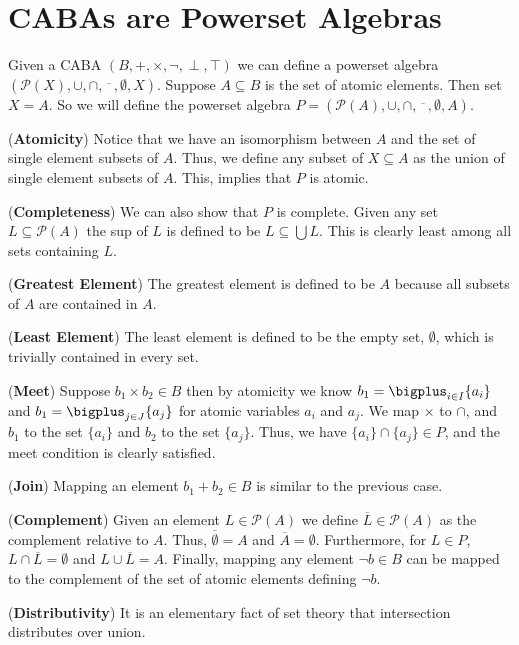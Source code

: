 \documentclass{article}
\newcommand{\powerset}[1]{\mathcal{P}(#1)}
\newcommand{\comp}[1]{\overline{#1}}
\begin{document}
\section{CABAs are Powerset Algebras}
\label{sec:cabas_are_powerset_algebras}

Given a CABA $(B,+,\times,\lnot,\perp,\top)$ we can define a powerset
algebra $(\powerset{X},\cup,\cap,
\overline{\stackrel{\,\,\,\,}{\stackrel{\,\,\,\,}{\,\,\,\,}}},\emptyset,X)$.
Suppose $A \subseteq B$ is the set of atomic elements.  Then set $X =
A$.  So we will define the powerset algebra $P = (\powerset{A},\cup,\cap,
\overline{\stackrel{\,\,\,\,}{\stackrel{\,\,\,\,}{\,\,\,\,}}},\emptyset,A)$.

(\textbf{Atomicity}) Notice that we have an isomorphism between
$A$ and the set of single element subsets of $A$.  Thus, we define any
subset of $X \subseteq A$ as the union of single element subsets of
$A$.  This, implies that $P$ is atomic.

(\textbf{Completeness}) We can also show that $P$ is complete.  Given
any set $L \subseteq \powerset{A}$ the sup of $L$ is defined to be $L
\subseteq \bigcup L$.  This is clearly least among all sets containing
$L$.

(\textbf{Greatest Element}) The greatest element is defined to be $A$
because all subsets of $A$ are contained in $A$.

(\textbf{Least Element}) The least element is defined to be the empty
set, $\emptyset$, which is trivially contained in every set.

(\textbf{Meet}) Suppose $b_1 \times b_2 \in B$ then by atomicity we
know $b_1 = \bigplus_{i \in I} \{a_i\}$ and $b_1 = \bigplus_{j \in J}
\{a_j\}$ for atomic variables $a_i$ and $a_j$.  We map $\times$ to
$\cap$, and $b_1$ to the set $\{a_i\}$ and $b_2$ to the set $\{a_j\}$.
Thus, we have $\{a_i\} \cap \{a_j\} \in P$, and the meet condition is
clearly satisfied.

(\textbf{Join}) Mapping an element $b_1 + b_2 \in B$ is similar to the
previous case.

(\textbf{Complement}) Given an element $L \in \powerset{A}$ we define
$\comp{L} \in \powerset{A}$ as the complement relative to $A$. Thus,
$\comp{\emptyset} = A$ and $\comp{A} = \emptyset$.  Furthermore, for
$L \in P$, $L \cap \comp{L} = \emptyset$ and $L \cup \comp{L} = A$.
Finally, mapping any element $\lnot b \in B$ can be mapped to the
complement of the set of atomic elements defining $\lnot b$.

(\textbf{Distributivity}) It is an elementary fact of set theory that
intersection distributes over union.
\end{document}
